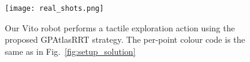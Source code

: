 
\begin{figure}
\centering
  \texttt{[image: real\_shots.png]}
\caption{Our Vito robot performs a tactile exploration action using the proposed GPAtlasRRT strategy. The per-point colour code  is the same as in Fig.~\ref{fig:setup_solution}}
\label{fig:real}
\end{figure}